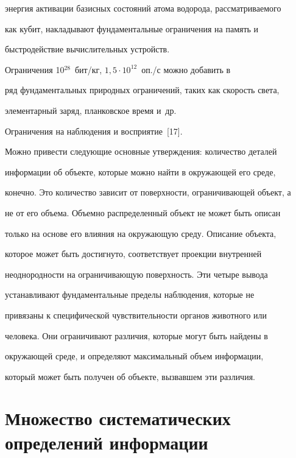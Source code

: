 энергия активации базисных состояний атома водорода, рассматриваемого 


как кубит, накладывают фундаментальные ограничения на память и 


быстродействие вычислительных устройств.


   


   Ограничения 10$^{28}$~бит/кг, $1{,}5\cdot 10^{12}$~оп./с можно добавить в 


ряд фундаментальных природных ограничений, таких как скорость света, 


элементарный заряд, планковское время и~др.


   


   Ограничения на наблюдения и восприятие~[17].


   


   Можно привести следующие основные утверждения: количество деталей 


информации об объекте, которые можно найти в окружающей его среде, 


конечно. Это количество зависит от поверхности, ограничивающей объект, а 


не от его объема. Объемно распределенный объект не может быть описан 


только на основе его влияния на окружающую среду. Описание объекта, 


которое может быть достигнуто, соответствует проекции внутренней 


неоднородности на ограничивающую поверхность. Эти четыре вывода 


устанавливают фундаментальные пределы наблюдения, которые не 


привязаны к специфической чувствительности органов животного или 


человека. Они ограничивают различия, которые могут быть найдены в 


окружающей среде, и определяют максимальный объем информации, 


который может быть получен об объекте, вызвавшем эти различия.





\section{Множество систематических определений информации}


